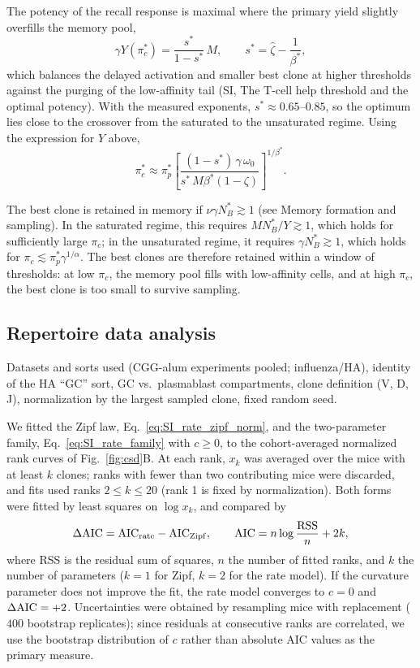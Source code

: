 \documentclass[aps, pre, twocolumn, 10pt, groupedaddress, superscriptaddress, linenumbers]{revtex4-2}
\newcommand{\EQ}{\begin{equation}}
\newcommand{\EE}{\end{equation}}
\newcommand{\todo}[1]{{\noindent \color{red} #1}}
\begin{document}
The potency of the recall response is maximal where the primary yield slightly overfills the memory pool,
\EQ
\gamma Y(\pi_c^*) = \frac{s^*}{1-s^*}\, M, \qquad s^* = \hat\zeta - \frac{1}{\beta^*},
\EE
which balances the delayed activation and smaller best clone at higher thresholds against the purging of the low-affinity tail (SI, The T-cell help threshold and the optimal potency).
With the measured exponents, $s^* \approx 0.65$--$0.85$, so the optimum lies close to the crossover from the saturated to the unsaturated regime.
Using the expression for $Y$ above,
\EQ
\pi_c^* \approx \pi_p^* \left[\frac{(1-s^*)\,\gamma\,\omega_0}{s^*\, M \beta^*(1-\zeta)}\right]^{1/\beta^*}.
\EE

The best clone is retained in memory if $\nu\gamma N_B^* \gtrsim 1$ (see Memory formation and sampling).
In the saturated regime, this requires $M N_B^*/Y \gtrsim 1$, which holds for sufficiently large $\pi_c$; in the unsaturated regime, it requires $\gamma N_B^* \gtrsim 1$, which holds for $\pi_c \lesssim \pi_p^*\gamma^{1/\alpha}$.
The best clones are therefore retained within a window of thresholds: at low $\pi_c$, the memory pool fills with low-affinity cells, and at high $\pi_c$, the best clone is too small to survive sampling.

\subsection*{Repertoire data analysis}
\todo{Datasets and sorts used (CGG-alum experiments pooled; influenza/HA), identity of the HA ``GC'' sort, GC vs.\ plasmablast compartments, clone definition (V, D, J), normalization by the largest sampled clone, fixed random seed.}

We fitted the Zipf law, Eq.~\ref{eq:SI_rate_zipf_norm}, and the two-parameter family, Eq.~\ref{eq:SI_rate_family} with $c \geq 0$, to the cohort-averaged normalized rank curves of Fig.~\ref{fig:csd}B.
At each rank, $x_k$ was averaged over the mice with at least $k$ clones; ranks with fewer than two contributing mice were discarded, and fits used ranks $2 \leq k \leq 20$ (rank 1 is fixed by normalization).
Both forms were fitted by least squares on $\log x_k$, and compared by
\EQ
\Delta{\rm AIC} = {\rm AIC}_{\rm rate} - {\rm AIC}_{\rm Zipf},
\qquad
{\rm AIC} = n \log\frac{\rm RSS}{n} + 2k,
\label{eq:rate_AIC}
\EE
where RSS is the residual sum of squares, $n$ the number of fitted ranks, and $k$ the number of parameters ($k = 1$ for Zipf, $k = 2$ for the rate model).
If the curvature parameter does not improve the fit, the rate model converges to $c = 0$ and $\Delta{\rm AIC} = +2$.
Uncertainties were obtained by resampling mice with replacement ($400$ bootstrap replicates); since residuals at consecutive ranks are correlated, we use the bootstrap distribution of $c$ rather than absolute AIC values as the primary measure.
\end{document}
